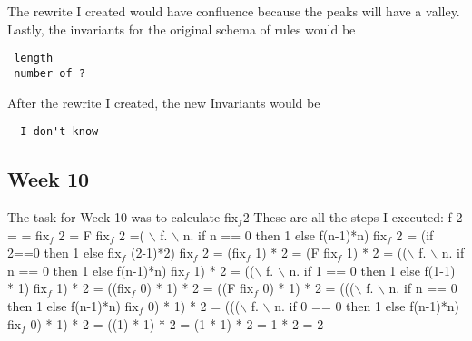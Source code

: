 \documentclass{article}
\theoremstyle{theorem}
\theoremstyle{definition}
\theoremstyle{remark}
\begin{document}
 \noindent\newline The rewrite I created would have confluence because the peaks will have a valley. Lastly, the invariants for the original schema of rules would be 
 
 \begin{verbatim}
 length
 number of ? 
 \end{verbatim}
  
  After the rewrite I created, the new Invariants would be
  \begin{verbatim}
  I don't know 
  \end{verbatim}
  
 \subsection{Week 10}
 The task for Week 10 was to calculate
 \newline
\newline fix$_f$2
 \newline
 \newline These are all the steps I executed: \newline
f 2 = \newline
= fix$_f$ 2 \newline
= F fix$_f$ 2 \newline
=( $\backslash$ f. $\backslash$ n. if n == 0 then 1 else f(n-1)*n) fix$_f$ 2 \newline
=  (if 2==0 then 1 else fix$_f$ (2-1)*2) fix$_f$ 2 \newline
= (fix$_f$ 1) * 2 \newline 
=  (F fix$_f$ 1) * 2 \newline
= (($\backslash$ f. $\backslash$ n. if n == 0 then 1 else f(n-1)*n) fix$_f$ 1) * 2 \newline
= (($\backslash$ f. $\backslash$ n. if 1 == 0 then 1 else f(1-1) * 1) fix$_f$ 1) * 2 \newline
= ((fix$_f$ 0) * 1) * 2 \newline
= ((F fix$_f$ 0) * 1) * 2 \newline
= ((($\backslash$ f. $\backslash$ n. if n == 0 then 1 else f(n-1)*n) fix$_f$ 0) * 1) * 2 \newline
= ((($\backslash$ f. $\backslash$ n. if 0 == 0 then 1 else f(n-1)*n) fix$_f$ 0) * 1) * 2 \newline
= ((1) * 1) * 2 \newline
= (1 * 1) * 2 \newline
= 1 * 2 \newline
= 2 \newline
\end{document}
